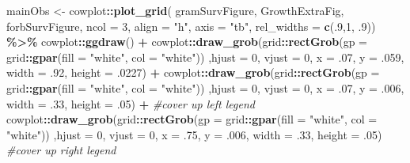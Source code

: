\documentclass[
]{article}
\newenvironment{Shaded}{\begin{snugshade}}{\end{snugshade}}
\newcommand{\CommentTok}[1]{\textcolor[rgb]{0.56,0.35,0.01}{\textit{#1}}}
\newcommand{\DataTypeTok}[1]{\textcolor[rgb]{0.13,0.29,0.53}{#1}}
\newcommand{\DecValTok}[1]{\textcolor[rgb]{0.00,0.00,0.81}{#1}}
\newcommand{\FloatTok}[1]{\textcolor[rgb]{0.00,0.00,0.81}{#1}}
\newcommand{\KeywordTok}[1]{\textcolor[rgb]{0.13,0.29,0.53}{\textbf{#1}}}
\newcommand{\NormalTok}[1]{#1}
\newcommand{\OperatorTok}[1]{\textcolor[rgb]{0.81,0.36,0.00}{\textbf{#1}}}
\newcommand{\StringTok}[1]{\textcolor[rgb]{0.31,0.60,0.02}{#1}}
\begin{document}
\begin{Shaded}
\begin{Highlighting}[]
\NormalTok{mainObs \textless{}{-}}\StringTok{ }\NormalTok{cowplot}\OperatorTok{::}\KeywordTok{plot\_grid}\NormalTok{( gramSurvFigure, GrowthExtraFig, forbSurvFigure, }\DataTypeTok{ncol =} \DecValTok{3}\NormalTok{, }\DataTypeTok{align =} \StringTok{"h"}\NormalTok{, }\DataTypeTok{axis =} \StringTok{"tb"}\NormalTok{, }\DataTypeTok{rel\_widths =} \KeywordTok{c}\NormalTok{(.}\DecValTok{9}\NormalTok{,}\DecValTok{1}\NormalTok{, }\FloatTok{.9}\NormalTok{)) }\OperatorTok{\%\textgreater{}\%}\StringTok{ }
\StringTok{  }\NormalTok{cowplot}\OperatorTok{::}\KeywordTok{ggdraw}\NormalTok{() }\OperatorTok{+}\StringTok{ }
\StringTok{  }\NormalTok{cowplot}\OperatorTok{::}\KeywordTok{draw\_grob}\NormalTok{(grid}\OperatorTok{::}\KeywordTok{rectGrob}\NormalTok{(}\DataTypeTok{gp =}\NormalTok{ grid}\OperatorTok{::}\KeywordTok{gpar}\NormalTok{(}\DataTypeTok{fill =} \StringTok{"white"}\NormalTok{, }\DataTypeTok{col =} \StringTok{"white"}\NormalTok{)) ,}\DataTypeTok{hjust =} \DecValTok{0}\NormalTok{, }\DataTypeTok{vjust =} \DecValTok{0}\NormalTok{, }\DataTypeTok{x =} \FloatTok{.07}\NormalTok{, }\DataTypeTok{y =} \FloatTok{.059}\NormalTok{, }\DataTypeTok{width =} \FloatTok{.92}\NormalTok{, }\DataTypeTok{height =} \FloatTok{.0227}\NormalTok{) }\OperatorTok{+}
\StringTok{  }\NormalTok{cowplot}\OperatorTok{::}\KeywordTok{draw\_grob}\NormalTok{(grid}\OperatorTok{::}\KeywordTok{rectGrob}\NormalTok{(}\DataTypeTok{gp =}\NormalTok{ grid}\OperatorTok{::}\KeywordTok{gpar}\NormalTok{(}\DataTypeTok{fill =} \StringTok{"white"}\NormalTok{, }\DataTypeTok{col =} \StringTok{"white"}\NormalTok{)) ,}\DataTypeTok{hjust =} \DecValTok{0}\NormalTok{, }\DataTypeTok{vjust =} \DecValTok{0}\NormalTok{, }\DataTypeTok{x =} \FloatTok{.07}\NormalTok{, }\DataTypeTok{y =} \FloatTok{.006}\NormalTok{, }\DataTypeTok{width =} \FloatTok{.33}\NormalTok{, }\DataTypeTok{height =} \FloatTok{.05}\NormalTok{) }\OperatorTok{+}\StringTok{ }\CommentTok{\#cover up left legend }
\StringTok{  }\NormalTok{cowplot}\OperatorTok{::}\KeywordTok{draw\_grob}\NormalTok{(grid}\OperatorTok{::}\KeywordTok{rectGrob}\NormalTok{(}\DataTypeTok{gp =}\NormalTok{ grid}\OperatorTok{::}\KeywordTok{gpar}\NormalTok{(}\DataTypeTok{fill =} \StringTok{"white"}\NormalTok{, }\DataTypeTok{col =} \StringTok{"white"}\NormalTok{)) ,}\DataTypeTok{hjust =} \DecValTok{0}\NormalTok{, }\DataTypeTok{vjust =} \DecValTok{0}\NormalTok{, }\DataTypeTok{x =} \FloatTok{.75}\NormalTok{, }\DataTypeTok{y =} \FloatTok{.006}\NormalTok{, }\DataTypeTok{width =} \FloatTok{.33}\NormalTok{, }\DataTypeTok{height =} \FloatTok{.05}\NormalTok{) }\CommentTok{\#cover up right legend}


\end{Highlighting}
\end{Shaded}
\end{document}
